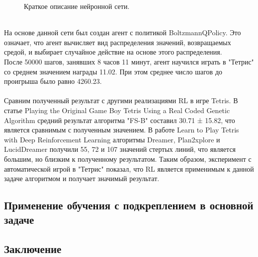 \documentclass{article}
\begin{document}
\begin{figure}[h]
\caption{Краткое описание нейронной сети.}
\label{ris:image}
\end{figure}\\
На основе данной сети был создан агент с политикой BoltzmannQPolicy. Это означает, что агент вычисляет вид распределения значений, возвращаемых средой, и выбирает случайное действие на основе этого распределения.\\
После 50000 шагов, занявших 8 часов 11 минут, агент научился играть в "Тетрис" со среднем значением награды 11.02. При этом среднее число шагов до проигрыша было равно 4260.23.\\~\\
Сравним полученный результат с другими реализациями RL в игре Tetris. В статье Playing the Original Game Boy Tetris Using a Real Coded Genetic Algorithm\cite{litlink7} средний результат алгоритма "FS-B" составил 30.71 ± 15.82, что является сравнимым с полученным значением. В работе Learn to Play Tetris with Deep Reinforcement Learning\cite{litlink20} алгоритмы Dreamer, Plan2xplore и LucidDreamer получили 55, 72 и 107 значений стертых линий, что является большим, но близким к полученному результатом. Таким образом, эксперимент с автоматической игрой в "Тетрис" показал, что RL является применимым к данной задаче алгоритмом и получает значимый результат.
\newpage
\begin{center}
\item\subsection{Применение обучения с подкреплением в основной задаче}
\end{center}
\newpage
\begin{center}
\section {Заключение}
\end{center}
\end{document}
